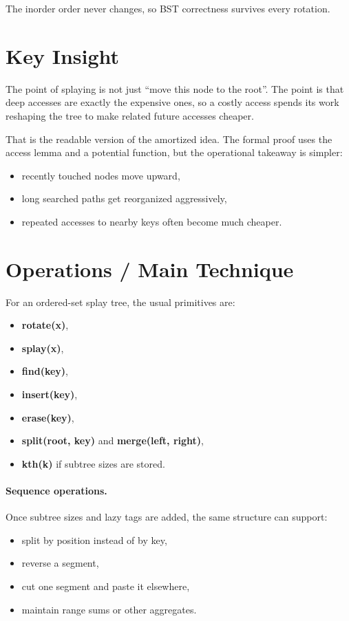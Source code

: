 The inorder order never changes, so BST correctness survives every rotation.

\section*{Key Insight}

The point of splaying is not just ``move this node to the root''. The point is that deep accesses are exactly the
expensive ones, so a costly access spends its work reshaping the tree to make related future accesses cheaper.

That is the readable version of the amortized idea. The formal proof uses the access lemma and a potential function,
but the operational takeaway is simpler:

\begin{itemize}
  \item recently touched nodes move upward,
  \item long searched paths get reorganized aggressively,
  \item repeated accesses to nearby keys often become much cheaper.
\end{itemize}

\section*{Operations / Main Technique}

For an ordered-set splay tree, the usual primitives are:

\begin{itemize}
  \item \textbf{rotate(x)},
  \item \textbf{splay(x)},
  \item \textbf{find(key)},
  \item \textbf{insert(key)},
  \item \textbf{erase(key)},
  \item \textbf{split(root, key)} and \textbf{merge(left, right)},
  \item \textbf{kth(k)} if subtree sizes are stored.
\end{itemize}

\paragraph{Sequence operations.}
Once subtree sizes and lazy tags are added, the same structure can support:

\begin{itemize}
  \item split by position instead of by key,
  \item reverse a segment,
  \item cut one segment and paste it elsewhere,
  \item maintain range sums or other aggregates.
\end{itemize}

